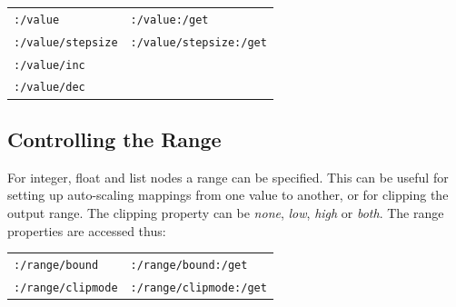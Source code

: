 \documentclass{NIME-alternate}
\begin{document}
\begin{tabular}{ll}
	\texttt{:/value} & \texttt{:/value:/get} \\
	\texttt{:/value/stepsize}  & \texttt{:/value/stepsize:/get} \\
	\texttt{:/value/inc} \\
	\texttt{:/value/dec} \\
\end{tabular}





\subsection{Controlling the Range} %
\label{sub:range}

For integer, float and list nodes a range can be specified. This can be useful for setting up auto-scaling mappings from one value to another, or for clipping the output range. The clipping property can be \emph{none}, \emph{low}, \emph{high} or \emph{both}. The range properties are accessed thus:

\begin{tabular}{ll}
	\texttt{:/range/bound} & \texttt{:/range/bound:/get} \\
	\texttt{:/range/clipmode}  & \texttt{:/range/clipmode:/get} \\
\end{tabular}






%
%
%
\end{document}
